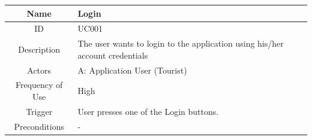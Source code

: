 \documentclass[12pt, a4paper, oneside]{article}
\begin{document}
\begin{table}[H]
\begin{tabularx}{\linewidth}{|c|X|}
\hline
Name & Login                                                                                                                                                                                                                                                                               \\ \hline
ID                          & UC001                                                                                                                                                                                                                                                                                                       \\ \hline
Description                 & The user wants to login to the application using his/her account credentials                                                                                                                                                                                                                            \\ \hline
Actors                      & A: Application User (Tourist)                                                                                                                                                                                                                                                                                  \\ \hline
Frequency of Use            & High                                                                                                                                                                                                                                                                                                        \\ \hline
Trigger                     & User presses one of the Login buttons.                                                                                                                                                                                                                                                                      \\ \hline
Preconditions               & -                                                                                                                                                                                                                                                                                                           \\ \hline

\end{tabularx}
\end{table}
\end{document}
